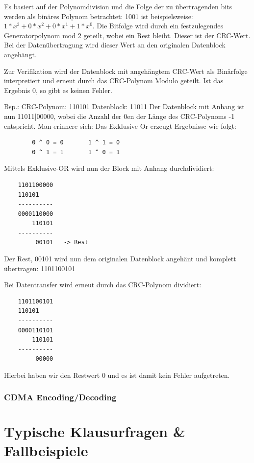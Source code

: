 \documentclass{scrartcl}
\begin{document}
    Es basiert auf der Polynomdivision und die Folge der zu übertragenden bits werden als binäres Polynom betrachtet: 1001 ist beispielsweise: $1*x^3 + 0*x^2 + 0*x^1 + 1*x^0$.
    Die Bitfolge wird durch ein festzulegendes Generatorpolynom mod 2 geteilt, wobei ein Rest bleibt. Dieser ist der CRC-Wert. Bei der Datenübertragung wird dieser Wert an den originalen Datenblock angehängt.
    
    Zur Verifikation wird der Datenblock mit angehängtem CRC-Wert als Binärfolge interpretiert und erneut durch das CRC-Polynom Modulo geteilt. Ist das Ergebnis 0, so gibt es keinen Fehler.
    
    
    Bsp.:
    CRC-Polynom: 110101
    Datenblock: 11011
    Der Datenblock mit Anhang ist nun 11011|00000, wobei die Anzahl der 0en der Länge des CRC-Polynoms -1 entspricht. Man erinnere sich: Das Exklusive-Or erzeugt Ergebnisse wie folgt:
    \begin{verbatim}
        0 ^ 0 = 0       1 ^ 1 = 0
        0 ^ 1 = 1       1 ^ 0 = 1
    \end{verbatim}
    Mittels Exklusive-OR wird nun der Block mit Anhang durchdividiert:

    \begin{verbatim}
    1101100000
    110101
    ----------
    0000110000
        110101
    ----------
         00101   -> Rest
    \end{verbatim}
    Der Rest, 00101 wird nun dem originalen Datenblock angehänt und komplett übertragen: 1101100101
    
    Bei Datentransfer wird erneut durch das CRC-Polynom dividiert:
    \begin{verbatim}
    1101100101
    110101
    ----------
    0000110101
        110101
    ----------
         00000
    \end{verbatim}
    Hierbei haben wir den Restwert 0 und es ist damit kein Fehler aufgetreten.
    
    \subsubsection{ CDMA Encoding/Decoding}
    
\section{Typische Klausurfragen \& Fallbeispiele}
\end{document}
